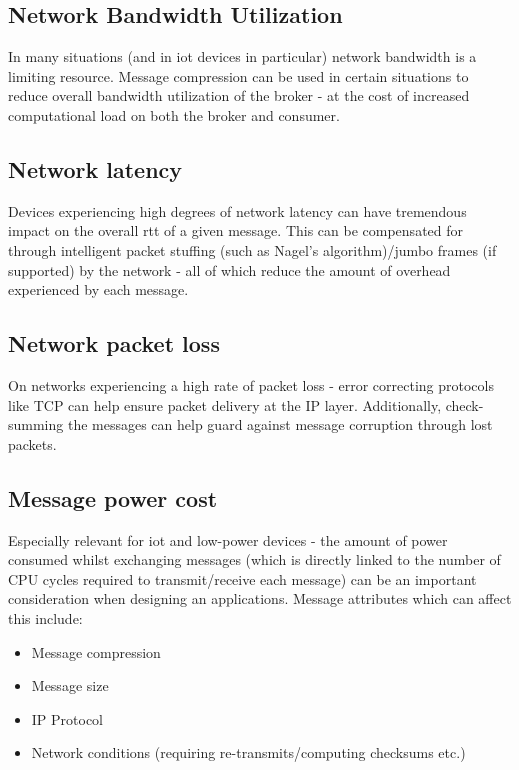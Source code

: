 \subsection{Network Bandwidth Utilization}
\label{sub:Network Bandwidth Utilization}

In many situations (and in \gls{iot} devices in particular) network bandwidth is
a limiting resource. Message compression can be used in certain situations to
reduce overall bandwidth utilization of the broker - at the cost of increased
computational load on both the broker and consumer.

\subsection{Network latency}
\label{sub:Network latency}

Devices experiencing high degrees of network latency can have tremendous impact
on the overall \gls{rtt} of a given message. This can be compensated for through
intelligent packet stuffing (such as Nagel's algorithm)/jumbo frames (if
supported) by the network - all of which reduce the amount of overhead
experienced by each message.

\subsection{Network packet loss}
\label{sub:Network packet loss}

On networks experiencing a high rate of packet loss - error correcting protocols
like TCP can help ensure packet delivery at the IP layer. Additionally,
check-summing the messages can help guard against message corruption through
lost packets.

\subsection{Message power cost}
\label{sub:Message power cost}

Especially relevant for \gls{iot} and low-power devices - the amount of power
consumed whilst exchanging messages (which is directly linked to the number of
CPU cycles required to transmit/receive each message) can be an important
consideration when designing an applications. Message attributes which can
affect this include:

\begin{itemize}
  \item Message compression
  \item Message size
  \item IP Protocol
  \item Network conditions (requiring re-transmits/computing checksums etc.)
\end{itemize}

